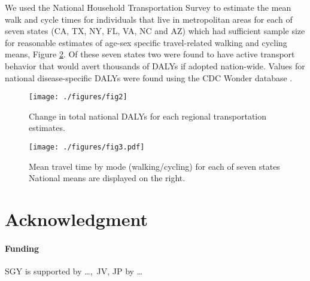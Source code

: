 \documentclass{bioinfo}
\newcommand{\bi}{\begin{itemize}}
\newcommand{\ei}{\end{itemize}}
\begin{document}
We used the National Household Transportation Survey \cite{NHTS} to
estimate the mean walk and cycle times for individuals that live in
metropolitan areas for each of seven states (CA, TX, NY, FL, VA, NC
and AZ) which had sufficient sample size for reasonable estimates of
age-sex specific travel-related walking and cycling means, Figure
\ref{meanMatrices}.  Of these seven states two were found to have
active transport behavior that would avert thousands of DALYs if
adopted nation-wide. Values for national disease-specific DALYs were
found using the CDC Wonder database \cite{CDCWonder}.
  

\begin{figure}[t]
    \centerline{\texttt{[image: ./figures/fig2]}}
    \caption{Change in total national DALYs for each regional
      transportation estimates.}\label{dalyFigure}
\end{figure}

\begin{figure}[t]
  \centerline{\texttt{[image: ./figures/fig3.pdf]}}
    \caption{Mean travel time by mode (walking/cycling) for each of
      seven states National means are displayed on the right.}\label{meanMatrices}
\end{figure}

\section*{Acknowledgment}
\paragraph{Funding\textcolon} SGY is supported by \ldots,\ JV, JP by \ldots

%

%

\end{document}
